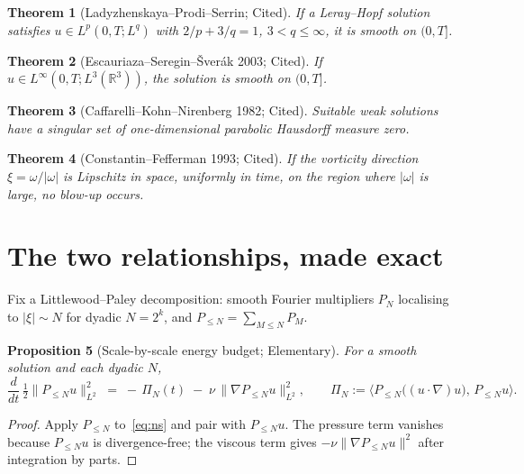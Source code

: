 \documentclass[11pt]{article}
\newtheorem{theorem}{Theorem}[section]
\newtheorem{proposition}[theorem]{Proposition}
\theoremstyle{definition}
\theoremstyle{remark}
\newcommand{\R}{\mathbb{R}}
\begin{document}
\begin{theorem}[Ladyzhenskaya--Prodi--Serrin; Cited]
If a Leray--Hopf solution satisfies $u\in L^p(0,T;L^q)$ with
$2/p+3/q=1$, $3<q\le\infty$, it is smooth on $(0,T]$.
\end{theorem}

\begin{theorem}[Escauriaza--Seregin--\v{S}ver\'ak 2003; Cited]
If $u\in L^\infty(0,T;L^3(\R^3))$, the solution is smooth on $(0,T]$.
\end{theorem}

\begin{theorem}[Caffarelli--Kohn--Nirenberg 1982; Cited]
Suitable weak solutions have a singular set of one-dimensional parabolic
Hausdorff measure zero.
\end{theorem}

\begin{theorem}[Constantin--Fefferman 1993; Cited]
If the vorticity direction $\xi=\omega/|\omega|$ is Lipschitz in space,
uniformly in time, on the region where $|\omega|$ is large, no blow-up
occurs.
\end{theorem}

\section{The two relationships, made exact}

Fix a Littlewood--Paley decomposition: smooth Fourier multipliers $P_N$
localising to $|\xi|\sim N$ for dyadic $N=2^k$, and $P_{\le N}=\sum_{M\le N}P_M$.

\begin{proposition}[Scale-by-scale energy budget; Elementary]\label{prop:budget}
For a smooth solution and each dyadic $N$,
\begin{equation}\label{eq:budget}
\frac{d}{dt}\,\tfrac12\|P_{\le N}u\|_{L^2}^2
\;=\; -\,\Pi_N(t)\;-\;\nu\,\|\nabla P_{\le N}u\|_{L^2}^2,
\qquad
\Pi_N := \big\langle P_{\le N}\big((u\cdot\nabla)u\big),\,P_{\le N}u\big\rangle .
\end{equation}
\end{proposition}
\begin{proof}
Apply $P_{\le N}$ to~\eqref{eq:ns} and pair with $P_{\le N}u$. The pressure
term vanishes because $P_{\le N}u$ is divergence-free; the viscous term
gives $-\nu\|\nabla P_{\le N}u\|^2$ after integration by parts.
\end{proof}
\end{document}
